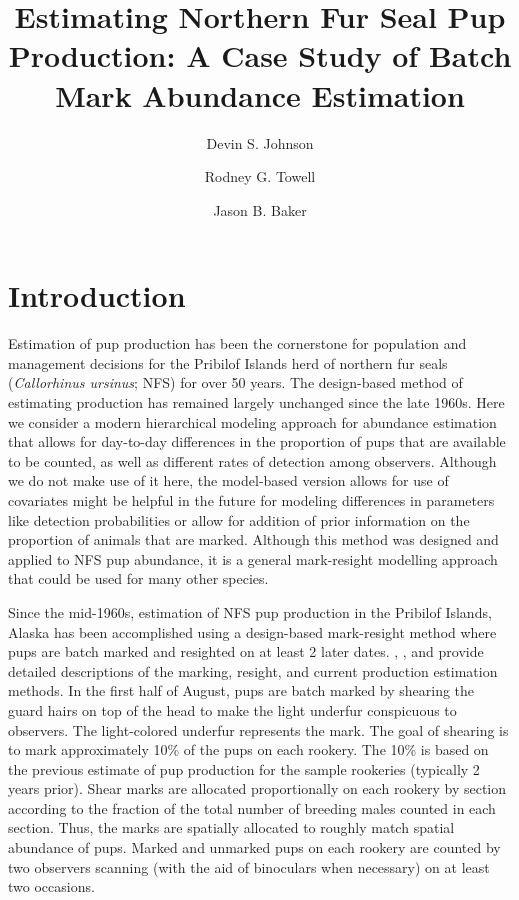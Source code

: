\documentclass[fleqn,10pt]{wlscirep}
\title{Estimating Northern Fur Seal Pup Production: A Case Study of Batch Mark Abundance Estimation}
\author[1,*]{Devin S. Johnson}
\author[1]{Rodney G. Towell}
\author[2]{Jason B. Baker}
\affil[1]{Alaska Fisheries Science Center, National Marine Fisheries Service, Seattle, Washington, USA}
\affil[2]{Pacific Islands Fisheries Science Center, National Marine Fisheries Service, Honolulu, Hawaii, USA}
\affil[*]{Email: devin.johnson@noaa.gov}
\begin{document}
\flushbottom
\maketitle
%
%
\thispagestyle{empty}


\section*{Introduction}

Estimation of pup production has been the cornerstone for population and management decisions for the Pribilof Islands herd of northern fur seals (\emph{Callorhinus ursinus}; NFS) for over 50 years. The design-based method of estimating production has remained largely unchanged since the late 1960s. Here we consider a modern hierarchical modeling approach for abundance estimation that allows for day-to-day differences in the proportion of pups that are available to be counted, as well as different rates of detection among observers. Although we do not make use of it here, the model-based version allows for use of covariates might be helpful in the future for modeling differences in parameters like detection probabilities or allow for addition of prior information on the proportion of animals that are marked. Although this method was designed and applied to NFS pup abundance, it is a general mark-resight modelling approach that could be used for many other species.

Since the mid-1960s, estimation of NFS pup production in the Pribilof Islands, Alaska has been accomplished using a design-based mark-resight method where pups are batch marked and resighted on at least 2 later dates. \cite{CHAPMAN:1968ys}, \cite{york1996xx}, and \cite{towell2016xx} provide detailed descriptions of the marking, resight, and current production estimation methods. In the first half of August, pups are batch marked by shearing the guard hairs on top of the head to make the light underfur conspicuous to observers. The light-colored underfur represents the mark. The goal of shearing is to mark approximately 10\% of the pups on each rookery. The 10\% is based on the previous estimate of pup production for the sample rookeries (typically 2 years prior). Shear marks are allocated proportionally on each rookery by section according to the fraction of the total number of breeding males counted in each section. Thus, the marks are spatially allocated to roughly match spatial abundance of pups. Marked and unmarked pups on each rookery are counted by two observers scanning (with the aid of binoculars when necessary) on at least two occasions.
\end{document}
